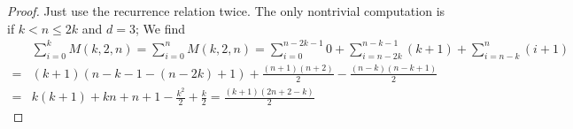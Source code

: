 \documentclass{scrartcl}
\theoremstyle{definition}
\begin{document}
\begin{proof}
    Just use the recurrence relation twice.
    The only nontrivial computation is if $k < n \leq 2k$ and $d = 3$; We find
    \begin{align*}
        &\sum_{i = 0}^k M(k, 2, n) = \sum_{i = 0}^n M(k, 2, n) = \sum_{i = 0}^{n - 2k - 1} 0 + \sum_{i = n - 2k}^{n - k - 1} (k + 1) + \sum_{i = n - k}^n (i + 1) \\
        =& (k + 1)(n - k - 1 - (n - 2k) + 1) + \frac {(n + 1)(n + 2)} 2 - \frac {(n - k)(n - k + 1)} 2 \\
        =& k(k + 1) + kn + n + 1 - \frac {k^2} 2 + \frac k 2 = \frac {(k + 1)(2n + 2 - k)} 2
    \end{align*}
\end{proof}
\end{document}
